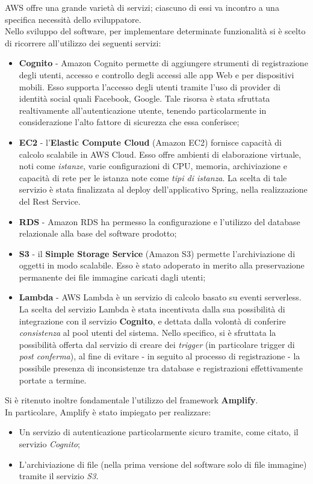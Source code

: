 \documentclass{natourDoc}
\begin{document}
AWS offre una grande varietà di servizi; ciascuno di essi va incontro a una specifica necessità dello sviluppatore. \\
Nello sviluppo del software, per implementare determinate funzionalità si è scelto di ricorrere all'utilizzo dei seguenti servizi:
\begin{itemize}
	\item \textbf{Cognito} - Amazon Cognito permette di aggiungere strumenti di registrazione degli utenti, accesso
	      e controllo degli accessi alle app Web e per dispositivi mobili. Esso supporta l'accesso degli utenti
	      tramite l'uso di provider di identità social quali Facebook, Google.
	      Tale risorsa è stata sfruttata realtivamente all'autenticazione utente, tenendo particolarmente in considerazione
	      l'alto fattore di sicurezza che essa conferisce;
	\item \textbf{EC2} - l'\textbf{Elastic Compute Cloud} (Amazon EC2) fornisce capacità di calcolo scalabile in AWS Cloud.
	      Esso offre ambienti di elaborazione virtuale, noti come \textit{istanze}, varie configurazioni di CPU, memoria,
	      archiviazione e capacità di rete per le istanza note come \textit{tipi di istanza}.
	      La scelta di tale servizio è stata finalizzata al \Gls{deploy} dell'applicativo Spring, nella realizzazione del Rest Service.
	\item \textbf{RDS} - Amazon RDS ha permesso la configurazione e l'utilizzo del database relazionale alla base del software prodotto;
	\item \textbf{S3} - il \textbf{Simple Storage Service} (Amazon S3) permette l'archiviazione di oggetti in modo scalabile.
	      Esso è stato adoperato in merito alla preservazione permanente dei file immagine caricati dagli utenti;
	\item \textbf{Lambda} - AWS Lambda è un servizio di calcolo basato su eventi serverless.
	      La scelta del servizio Lambda è stata incentivata dalla sua possibilità di integrazione con il servizio \textbf{Cognito}, e dettata
	      dalla volontà di conferire \textit{consistenza} al pool utenti del sistema.
	      Nello specifico, si è sfruttata la possibilità offerta dal servizio di creare dei \textit{trigger} (in particolare trigger di \textit{post conferma}), al fine di
	      evitare - in seguito al processo di registrazione - la possibile presenza di inconsistenze tra database e registrazioni effettivamente portate a termine.
\end{itemize}

Si è ritenuto inoltre fondamentale l'utilizzo del framework \textbf{Amplify}.\\
In particolare, Amplify è stato impiegato per realizzare:
\begin{itemize}
	\item Un servizio di autenticazione particolarmente sicuro tramite, come citato, il servizio \textit{Cognito};
	\item L'archiviazione di file (nella prima versione del software solo di file immagine) tramite il servizio \textit{S3}.
\end{itemize}
\end{document}
